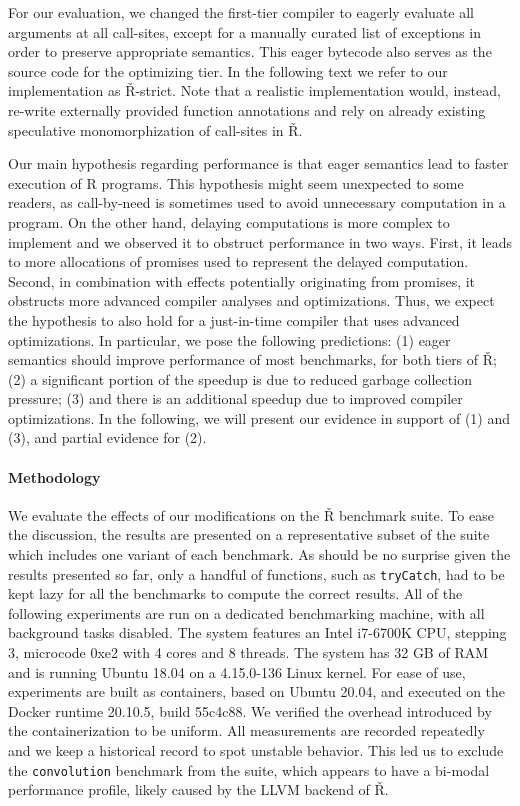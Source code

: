 \documentclass[review,creen,acmsmall]{acmart}
\renewcommand{\Rsh}{{\sf\v R}\xspace}
\newcommand{\Rshstrict}{{\sf\v R-strict}\xspace}
\begin{document}
For our evaluation, we changed the first-tier
compiler to eagerly evaluate all arguments at all call-sites, except for a
manually curated list of exceptions in order to preserve appropriate semantics.
This eager bytecode also serves as the source code for the optimizing tier. In the following
text we refer to our implementation as \Rshstrict. Note that a realistic implementation
would, instead, re-write externally provided function annotations and rely on already
existing speculative monomorphization of call-sites in \Rsh.

Our main hypothesis regarding performance is that eager semantics lead to faster
execution of R programs. This hypothesis might seem unexpected to some readers,
as call-by-need is sometimes used to avoid unnecessary computation in a program.
On the other hand, delaying computations is more complex to implement and we
observed it to obstruct performance in two ways. First, it leads to more
allocations of promises used to represent the delayed computation. Second, in
combination with effects potentially originating from promises, it obstructs
more advanced compiler analyses and optimizations. Thus, we expect the hypothesis
to also hold for a just-in-time compiler that uses advanced optimizations.
In particular, we pose the following predictions:
(1) eager semantics should improve performance of most benchmarks, for both tiers
of \Rsh; (2) a significant portion of the speedup is due to reduced garbage
collection pressure; (3) and there is an additional speedup due to improved compiler
optimizations. In the following, we will present our evidence in support of (1)
and (3), and partial evidence for (2).

\paragraph{Methodology}

We evaluate the effects of our modifications on the \Rsh benchmark suite.
To ease the discussion, the results are presented on a representative subset of
the suite which includes one variant of
each benchmark. As should be no surprise given the results presented so far,
only a handful of functions, such as
\lstinline{tryCatch}, had to be kept lazy for all the benchmarks to compute
the correct results.
All of the following experiments are run on a dedicated benchmarking machine, with
all background tasks disabled. The system features an Intel i7-6700K CPU, stepping 3,
microcode 0xe2 with 4 cores and 8 threads. The system has 32 GB of RAM and is
running Ubuntu 18.04 on a 4.15.0-136 Linux kernel. For ease of use, experiments
are built as containers, based on Ubuntu 20.04, and executed on
the Docker runtime 20.10.5, build 55c4c88. We verified the overhead introduced by
the containerization to be uniform. All measurements are recorded repeatedly and we
keep a historical record to spot unstable behavior. This led us to exclude the
\lstinline{convolution} benchmark from the suite, which appears to have a
bi-modal performance profile, likely caused by the LLVM backend of \Rsh.
\end{document}
